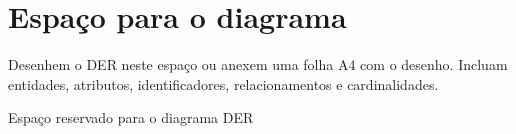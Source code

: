 \section{Espaço para o diagrama}

Desenhem o DER neste espaço ou anexem uma folha A4 com o desenho. Incluam entidades,
atributos, identificadores, relacionamentos e cardinalidades.

\begin{tcolorbox}[enhanced, colback=white, colframe=accent, boxrule=0.8pt,
  sharp corners, left=6pt, right=6pt, top=6pt, bottom=6pt, height=13cm]
\centering
\vfill
\color{gray}
\large Espaço reservado para o diagrama DER
\vfill
\end{tcolorbox}
